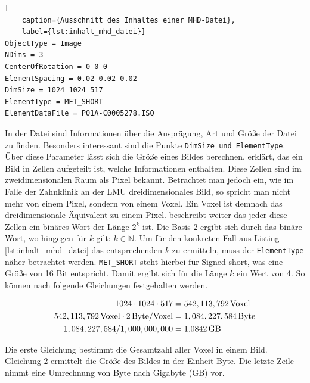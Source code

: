 \begin{lstlisting}[
	caption={Ausschnitt des Inhaltes einer MHD-Datei},
	label={lst:inhalt_mhd_datei}]
ObjectType = Image
NDims = 3
CenterOfRotation = 0 0 0
ElementSpacing = 0.02 0.02 0.02
DimSize = 1024 1024 517
ElementType = MET_SHORT
ElementDataFile = P01A-C0005278.ISQ
\end{lstlisting}

In der Datei sind Informationen über die Ausprägung, Art und Größe der Datei zu finden.
Besonders interessant sind die Punkte \texttt{DimSize und ElementType}. Über
diese Parameter lässt sich die Größe eines Bildes berechnen. \citet[Seite 10-11]{burger2009}
erklärt, das ein Bild in Zellen aufgeteilt ist, welche Informationen enthalten.
Diese Zellen sind im zweidimensionalen Raum als Pixel bekannt. Betrachtet man jedoch
ein, wie im Falle der Zahnklinik an der LMU dreidimensionales Bild, so spricht man
nicht mehr von einem Pixel, sondern von einem Voxel. Ein Voxel ist demnach das dreidimensionale
Äquivalent zu einem Pixel. \citet[Seite 10-11]{burger2009} beschreibt weiter das
jeder diese Zellen ein binäres Wort der Länge $2^{k}$ ist. Die Basis 2 ergibt sich
durch das binäre Wort, wo hingegen für $k$ gilt: $k \in \mathbb{N}$. Um für den
konkreten Fall aus Listing \ref{lst:inhalt_mhd_datei} das entsprechenden $k$ zu
ermitteln, muss der \texttt{ElementType} näher betrachtet werden. \texttt{MET\_SHORT}
steht hierbei für Signed short, was eine Größe von 16 Bit entspricht. Damit
ergibt sich für die Länge $k$ ein Wert von 4. So können nach \citet[Seite 10-11]{burger2009}
folgende Gleichungen festgehalten werden.

\begin{align}
	\label{equ:größe_bestimmen}1024 \cdot 1024 \cdot 517    & = 542,113,792 \, \text{Voxel}\notag  \\
	542,113,792 \, \text{Voxel}\cdot 2 \, \text{Byte/Voxel} & = 1,084,227,584 \, \text{Byte}\notag \\
	1,084,227,584 / 1,000,000,000                           & = 1.0842 \, \text{GB}
\end{align}

Die erste Gleichung bestimmt die Gesamtzahl aller Voxel in einem Bild. Gleichung
2 ermittelt die Größe des Bildes in der Einheit Byte. Die letzte Zeile nimmt eine
Umrechnung von Byte nach Gigabyte (GB) vor.

